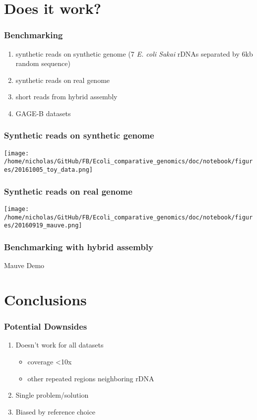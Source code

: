 \documentclass[10pt, compress]{beamer}
\begin{document}
\section{Does it work?}

\begin{frame}[fragile]
  \frametitle{Benchmarking}
  \begin{enumerate}
  \item synthetic reads on synthetic genome (7 \textit{E. coli Sakai} rDNAs separated by 6kb random sequence)
  \item synthetic reads on real genome
  \item short reads from hybrid assembly
  \item GAGE-B datasets
  \end{enumerate}

\end{frame}

\begin{frame}[fragile]
  \frametitle{Synthetic reads on synthetic genome}
  \hspace*{-0cm}
  \texttt{[image: /home/nicholas/GitHub/FB/Ecoli\_comparative\_genomics/doc/notebook/figures/20161005\_toy\_data.png]}
\end{frame}

\begin{frame}[fragile]
  \frametitle{Synthetic reads on real genome}
  \hspace*{-0cm}
  \texttt{[image: /home/nicholas/GitHub/FB/Ecoli\_comparative\_genomics/doc/notebook/figures/20160919\_mauve.png]}
\end{frame}

\begin{frame}[fragile]
  \frametitle{Benchmarking with hybrid assembly}
  Mauve Demo
\end{frame}

\section{Conclusions}
 \begin{frame}[fragile]
  \frametitle{Potential Downsides}
\begin{enumerate}
\item Doesn't work for all datasets
  \begin{itemize}
  \item coverage <10x
  \item other repeated regions neighboring rDNA
  \end{itemize}
  \item Single problem/solution
  \item Biased by reference choice
\end{enumerate}
\end{frame}
\end{document}
